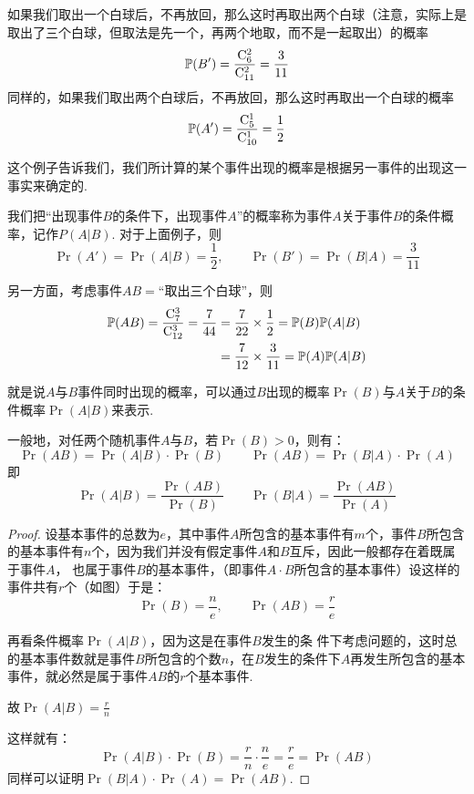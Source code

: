 如果我们取出一个白球后，不再放回，那么这时再取出两个白球（注意，实际上是取出了三个白球，但取法是先一个，再两个地取，而不是一起取出）的概率
\[\mathbb{P}(B')=\dfrac{{\rm C}^{2}_{6}}{{\rm C}^{2}_{11}}=\dfrac{3}{11}\]
同样的，如果我们取出两个白球后，不再放回，那么这时再取出一个白球的概率
\[\mathbb{P}(A')=\dfrac{{\rm C}^{1}_{5}}{{\rm C}^{1}_{10}}=\dfrac{1}{2}\]

这个例子告诉我们，我们所计算的某个事件出现的概率是根据另一事件的出现这一事实来确定的.

我们把“出现事件$B$的条件下，出现事件$A$”的概率称为事件$A$关于事件$B$的条件概率，记作$P(A|B)$. 对于上面例子，则
\[\Pr(A')=\Pr(A|B)=\frac{1}{2},\qquad \Pr(B')=\Pr(B|A)=\frac{3}{11}\]

另一方面，考虑事件$AB=$“取出三个白球”，则
\[\begin{split}
    \mathbb{P}(AB)=\dfrac{{\rm C}^{3}_{7}}{{\rm C}^{3}_{12}}=\dfrac{7}{44}&=\dfrac{7}{22}\times\dfrac{1}{2}=\mathbb{P}(B)\mathbb{P}(A|B)\\
    &=\dfrac{7}{12}\times\dfrac{3}{11}=\mathbb{P}(A)\mathbb{P}(A|B)\\
\end{split} \]

就是说$A$与$B$事件同时出现的概率，可以通过$B$出现的概率$\Pr(B)$与$A$关于$B$的条件概率$\Pr(A|B)$来表示.

一般地，对任两个随机事件$A$与$B$，若$\Pr(B)>0$，则有：
\begin{equation}
  \Pr(AB)=\Pr(A|B)\cdot \Pr(B)  \qquad \Pr(AB)=\Pr(B|A)\cdot \Pr(A)\tag{1}
\end{equation}
即
\begin{equation}
    \Pr(A|B)=\frac{\Pr(AB)}{\Pr(B)}\qquad \Pr(B|A)=\frac{\Pr(AB)}{\Pr(A)}\tag{2}
\end{equation}

\begin{proof}
    设基本事件的总数为$e$，其中事件$A$所包含的基本事件有$m$个，事件$B$所包含的基本事件有$n$个，因为我们并没有假定事件$A$和$B$互斥，因此一般都存在着既属于事件$A$，
也属于事件$B$的基本事件，（即事件$A\cdot B$所包含的基本事件）设这样的事件共有$r$个（如图）于是：
\[\Pr(B)=\frac{n}{e},\qquad \Pr(AB)=\frac{r}{e}\]

\begin{center}
\end{center}

再看条件概率$\Pr(A|B)$，因为这是在事件$B$发生的条
件下考虑问题的，这时总的基本事件数就是事件$B$所包含的个数$n$，在$B$发生的条件下$A$再发生所包含的基本事件，就必然是属于事件$AB$的$r$个基本事件.

故$\Pr(A|B)=\frac{r}{n}$

这样就有：
\[\Pr(A|B)\cdot\Pr(B)=\frac{r}{n}\cdot \frac{n}{e}=\frac{r}{e}=\Pr(AB)\]
同样可以证明$\Pr(B|A)\cdot\Pr(A)=\Pr(AB)$.
\end{proof}

